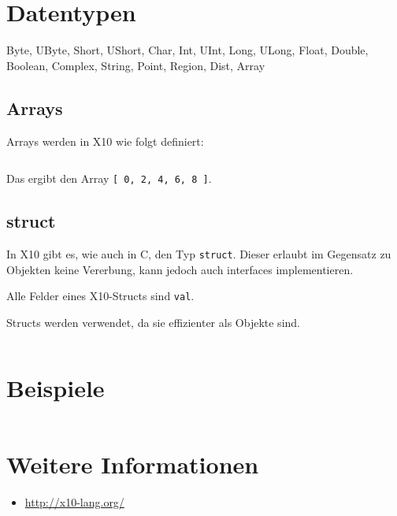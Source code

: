\section{Datentypen}
Byte, UByte, Short, UShort, Char, Int, UInt, Long, ULong, Float, Double, Boolean,
Complex, String, Point, Region, Dist, Array

\subsection{Arrays}%
Arrays werden in X10 wie folgt definiert:

\inputminted[numbersep=5pt, tabsize=4]{scala}{scripts/x10/array-example.x10}

Das ergibt den Array \texttt{[ 0, 2, 4, 6, 8 ]}.

\subsection{struct}%
In X10 gibt es, wie auch in C, den Typ \texttt{struct}. Dieser erlaubt im Gegensatz
zu Objekten keine Vererbung, kann jedoch auch interfaces implementieren.

Alle Felder eines X10-Structs sind \texttt{val}.

Structs werden verwendet, da sie effizienter als Objekte sind.

\begin{beispiel}[struct]
    \inputminted[numbersep=5pt, tabsize=4]{scala}{scripts/x10/x10-struct-example.x10}
\end{beispiel}

\section{Beispiele}

\inputminted[linenos, numbersep=5pt, tabsize=4, frame=lines, label=Fibonacci.x10]{scala}{scripts/x10/Fibonacci.x10}

\section{Weitere Informationen}
\begin{itemize}
    \item \url{http://x10-lang.org/}
\end{itemize}
